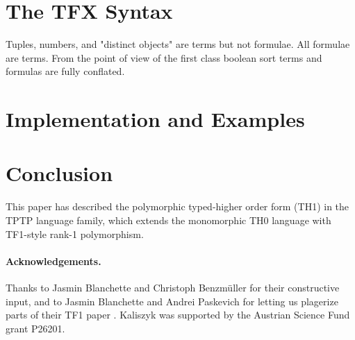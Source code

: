 \documentclass{easychair}
\begin{document}
\section{The TFX Syntax}
\label{TFX}

Tuples, numbers, and "distinct objects" are terms but not formulae.
All formulae are terms.  
From the point of view of the first class boolean sort terms and formulas 
are fully conflated.

\section{Implementation and Examples}
\label{ImplementationExamples}

\section{Conclusion}
\label{Conclusion}

This paper has described the polymorphic typed-higher order form (TH1)
in the TPTP language family, which extends the monomorphic TH0 language
with TF1-style rank-1 polymorphism.

\paragraph{Acknowledgements.}
Thanks to Jasmin Blanchette and Christoph Benzm{\"u}ller for their
constructive input, and to Jasmin Blanchette and Andrei Paskevich for
letting us plagerize parts of their TF1 paper \cite{BP13-TFF1}.
Kaliszyk was supported by the Austrian Science Fund grant P26201.



\end{document}
